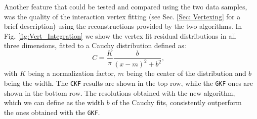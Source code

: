 Another feature that could be tested and compared using the two data samples, was the quality of the interaction vertex fitting (see Sec. \ref{Sec: Vertexing} for a brief description) using the reconstructions provided by the two algorithms. In Fig. \ref{fig:Vert_Integration} we show the vertex fit residual distributions in all three dimensions, fitted to a Cauchy distribution defined as:
\begin{equation}
    \label{eq:Cauchy}
    C=\frac{K}{\pi}\frac{b}{(x-m)^2+b^2},
\end{equation}
with $K$ being a normalization factor, $m$ being the center of the distribution and $b$ being the width. The \texttt{CKF} results are shown in the top row, while the \texttt{GKF} ones are shown in the bottom row. The resolutions obtained with the new algorithm, which we can define as the width $b$ of the Cauchy fits, consistently outperform the ones obtained with the \texttt{GKF}. 




